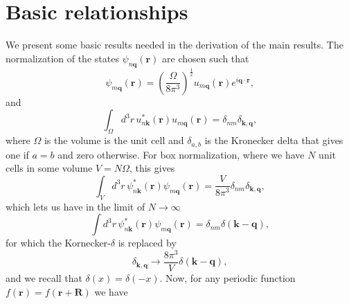 
\section{Basic relationships}\label{ap_basic}

We present some basic results needed in the derivation of the main
results. 
 The normalization of the
states $\psi_{n\mathbf{q}}(\mathbf{r})$ are chosen such that
\begin{equation}\label{a_uno}
\psi_{m\mathbf{q}}(\mathbf{r})=\left(\frac{\Omega}{8\pi^{3}}\right)^{\frac{1}{2}}u_{m\mathbf{q}}(\mathbf{r})e^{i\mathbf{q}\cdot\mathbf{r}}
,
\end{equation}
and
\begin{equation}\label{a_dos}
\int_{\Omega}d^{3}r\,
u_{n\mathbf{k}}^{*}(\mathbf{r})u_{m\mathbf{q}}(\mathbf{r})=\delta_{nm}\delta_{\mathbf{\mathbf{k},q}}
,
\end{equation}
where $\Omega$ is the volume is the unit cell and $\delta_{a,b}$ is the
Kronecker delta that gives one if $a=b$ and zero otherwise.
For box normalization,
where we have $N$ unit cells in some volume $V=N\Omega$, this gives
\begin{equation}\label{a_tres}
\int_{V}d^{3}r\,\psi_{n\mathbf{k}}^{*}(\mathbf{r})\psi_{m\mathbf{q}}(\mathbf{r})=\frac{V}{8\pi^{3}}\delta_{nm}\delta_{\mathbf{\mathbf{k},q}},
\end{equation}
which lets us have in the limit of $N\rightarrow\infty$
\begin{equation}\label{a_4}
\int
d^{3}r\,\psi_{n\mathbf{k}}^{*}(\mathbf{r})\psi_{m\mathbf{q}}(\mathbf{r})
=\delta_{nm}\delta(\mathbf{k}-\mathbf{q})
,
\end{equation}
for which the Kornecker-$\delta$ is replaced by
\begin{equation}\label{a_5}
\delta_{\mathbf{k},\mathbf{q}}\rightarrow\frac{8\pi^3}{V}\delta(\mathbf{k}-\mathbf{q})
,
\end{equation}
and we recall that $\delta(x)=\delta(-x)$. Now, for any periodic function
$f(\mathbf{r})=f(\mathbf{r}+\mathbf{R})$ we have
